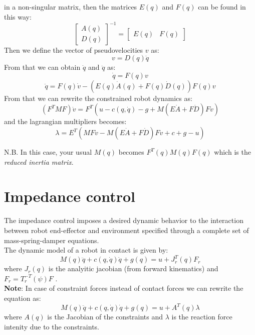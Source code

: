 \documentclass[a4paper,12pt]{article}
\begin{document}
in a non-singular matrix, then the matrices $E(q)$ and $F(q)$ can be found in this way:
\begin{equation}
    \begin{bmatrix}
        A(q)\\
        D(q)
    \end{bmatrix}^{-1}= \begin{bmatrix}
        E(q) & F(q)
    \end{bmatrix}
    \end{equation}
Then we define the vector of pseudovelocities $v$ as:
\begin{equation}
    v = D(q)\dot{q}
\end{equation}
From that we can obtain $\dot{q}$ and $\ddot{q}$ as:
\begin{equation}
    \dot{q} = F(q)v
\end{equation}
\begin{equation}
    \ddot{q} = F(q)\dot{v}  - (E(q)\dot{A}(q) + F(q)\dot{D}(q))F(q)v
\end{equation}
From that we can rewrite the constrained robot dynamics as:
\begin{equation}
   (F^TMF)\dot{v} = F^T(u-c(q,\dot{q})-g + M(E\dot{A}+F\dot{D})Fv)
\end{equation}
and the lagrangian multipliers becomes:
\begin{equation}
    \lambda = E^T(MF\dot{v}-M(E\dot{A}+F\dot{D})Fv + c + g -u)
\end{equation}

N.B. In this case, your usual $M(q)$ becomes $F^T(q)M(q)F(q)$ which is the \textit{reduced inertia matrix}.





\section{Impedance control}
The impedance control imposes a desired dynamic 
behavior to the interaction between
robot end-effector and environment specified through a
complete set of mass-spring-damper equations.\\
The dynamic model of a robot in contact is given by:
\begin{equation}
M(q)\ddot{q} + c(q,\dot{q})\dot{q} + g(q) = u + J_r^T(q)F_r
\end{equation}
where $J_r(q)$ is the analyitic jacobian (from forward kinematics)
and $F_r=T_r^{-T}(\psi)F$ .\\
\textbf{Note}: In case of constraint forces instead of contact
 forces we can rewrite the equation as:
\begin{equation}
    M(q)\ddot{q} + c(q,\dot{q})\dot{q} + g(q) = u + A^T(q)\lambda
\end{equation}
where $A(q)$ is the Jacobian of the constraints and $\lambda$ is 
the reaction force intenity due to the constraints.
\end{document}
